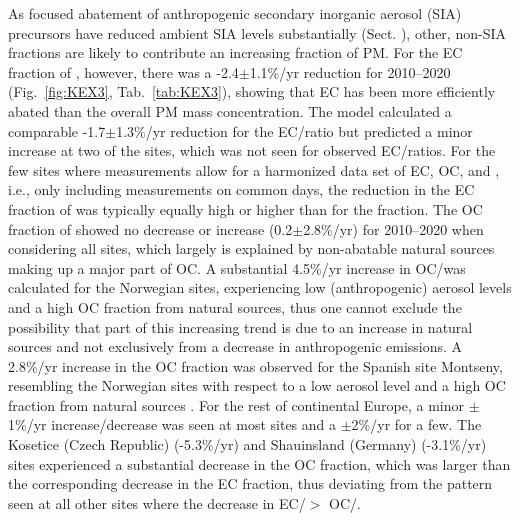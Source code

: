 As focused abatement of anthropogenic secondary inorganic aerosol (SIA)
precursors have reduced ambient SIA levels substantially (Sect. ),
other, non-SIA fractions are likely to contribute an increasing fraction
of PM. For the EC fraction of \pmfine, however, there was a -2.4$\pm$1.1\%/yr
reduction for 2010--2020 (Fig.~\ref{fig:KEX3}, Tab.~\ref{tab:KEX3}), showing that EC has been
more efficiently abated than the overall PM mass concentration. The model
calculated a comparable -1.7$\pm$1.3\%/yr reduction for the EC/\pmfine ratio
but predicted a minor increase at two of the sites, which was not seen for
observed EC/\pmfine ratios. For the few sites where measurements allow for
a harmonized data set of EC, OC,  and \pmfine, i.e., only including
measurements on common days, the reduction in the EC fraction of \pmfine
was typically equally high or higher than for the  fraction. The
OC fraction of \pmfine showed no decrease or increase (0.2$\pm$2.8\%/yr)
for 2010--2020 when considering all sites, which largely is explained by
non-abatable natural sources making up a major part of OC. A substantial
4.5\%/yr increase in OC/\pmfine was calculated for the Norwegian sites,
experiencing low (anthropogenic) aerosol levels and a high OC fraction
from natural sources, thus one cannot exclude the possibility that part
of this increasing trend is due to an increase in natural sources and
not exclusively from a decrease in anthropogenic emissions. A 2.8\%/yr
increase in the OC fraction was observed for the Spanish site Montseny,
resembling the Norwegian sites with respect to a low aerosol level and
a high OC fraction from natural sources \citep{Kulmala2011}. For the
rest of continental Europe, a minor $\pm$1\%/yr increase/decrease
was seen at most sites and a $\pm$2\%/yr for a few. The Kosetice
(Czech Republic) (-5.3\%/yr) and Shauinsland (Germany) (-3.1\%/yr) sites
experienced a substantial decrease in the OC fraction, which was larger
than the corresponding decrease in the EC fraction, thus deviating from
the pattern seen at all other sites where the decrease in EC/\pmfine $>$
OC/\pmfine.

